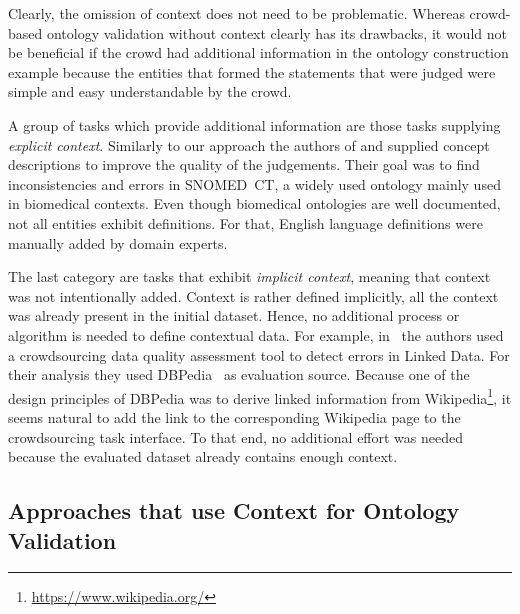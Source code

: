 Clearly, the omission of context does not need to be problematic. Whereas crowd-based ontology validation without context clearly has its drawbacks, it would not be beneficial if the crowd had additional information in the ontology construction example because the entities that formed the statements that were judged were simple and easy understandable by the crowd. 

A group of tasks which provide additional information are those tasks supplying \emph{explicit context}. Similarly to our approach the authors of \cite{mortensen2015} and \cite{mortensen2016} supplied concept descriptions to improve the quality of the judgements. Their goal was to find inconsistencies and errors in SNOMED~CT, a widely used ontology mainly used in biomedical contexts. Even though biomedical ontologies are well documented, not all entities exhibit definitions. For that, English language definitions were manually added by domain experts. 

The last category are tasks that exhibit \emph{implicit context}, meaning that context was not intentionally added. Context is rather defined implicitly, all the context was already present in the initial dataset. Hence, no additional process or algorithm is needed to define contextual data. For example, in~\cite{acosta2018} the authors used a crowdsourcing data quality assessment tool to detect errors in Linked Data. 
For their analysis they used DBPedia~\cite{auer2007} as evaluation source. Because one of the design principles of DBPedia was to derive linked information from Wikipedia\footnote{\url{https://www.wikipedia.org/}}, it seems natural to add the link to the corresponding Wikipedia page to the crowdsourcing task interface. To that end, no additional effort was needed because the evaluated dataset already contains enough context.
 


\subsection{Approaches that use Context for Ontology Validation}
